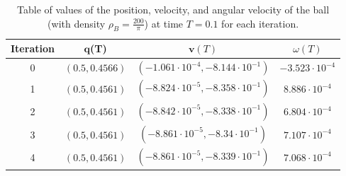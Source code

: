 \documentclass[a4paper]{amsart}
\numberwithin{equation}{section}
\theoremstyle{plain}
\newcommand{\mbf}[1]{\mathbf{#1}}
\begin{document}
\begin{table}[ht]
    \centering
    \begin{tabular}{|c|c|c|c|}
    \hline
        Iteration & $\mbf{q}$(T) & $\mbf{v}(T)$ & $\omega(T)$\\
        \hline
        0 &  $(0.5,0.4566)$ & $(-1.061\cdot 10^{-4},-8.144\cdot 10^{-1})$ & $-3.523\cdot 10^{-4}$\\
        \hline
        1 &  $(0.5,0.4561)$ & $(-8.824\cdot 10^{-5},-8.358\cdot 10^{-1})$ & $8.886\cdot 10^{-4}$\\
        \hline
        2 &  $(0.5,0.4561)$ & $(-8.842\cdot 10^{-5},-8.338\cdot 10^{-1})$ & $6.804\cdot 10^{-4}$\\
        \hline
        3 &  $(0.5,0.4561)$ & $(-8.861\cdot 10^{-5},-8.34\cdot 10^{-1})$ & $7.107\cdot 10^{-4}$\\
        \hline
        4 &  $(0.5,0.4561)$ & $(-8.861\cdot 10^{-5},-8.339\cdot 10^{-1})$ & $7.068\cdot 10^{-4}$\\
        \hline
    \end{tabular}
    \caption{Table of values of the position, velocity, and angular velocity of the ball (with density $\rho_B = \frac{200}{\pi}$) at time $T = 0.1$ for each iteration.}
    \label{table: fsi convergence}
\end{table}
\end{document}
